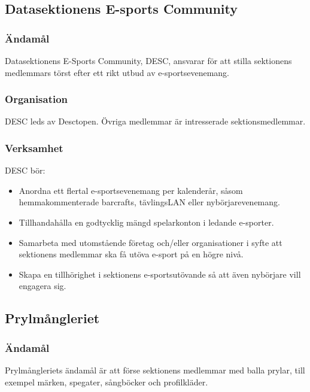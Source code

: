 \documentclass{dgovdoc}
\begin{document}
\subsection{Datasektionens E-sports Community}

\subsubsection{Ändamål}

Datasektionens E-Sports Community, DESC, ansvarar för att stilla sektionens
medlemmars törst efter ett rikt utbud av e-sportsevenemang.

\subsubsection{Organisation}

DESC leds av Desctopen. Övriga medlemmar är intresserade
sektionsmedlemmar.

\subsubsection{Verksamhet}

DESC bör:

\begin{itemize}
\item Anordna ett flertal e-sportsevenemang per kalenderår, såsom hemmakommenterade
barcrafts, tävlingsLAN eller nybörjarevenemang.
\item Tillhandahålla en godtycklig mängd spelarkonton i ledande e-sporter.
\item Samarbeta med utomstående företag och/eller organisationer i syfte att sektionens
medlemmar ska få utöva e-sport på en högre nivå.
\item Skapa en tillhörighet i sektionens e-sportsutövande så att även nybörjare vill engagera
sig.
\end{itemize}

\subsection{Prylmångleriet}

\subsubsection{Ändamål}

Prylmångleriets ändamål är att förse sektionens medlemmar med balla prylar, till exempel märken, spegater, sångböcker och profilkläder.
\end{document}
